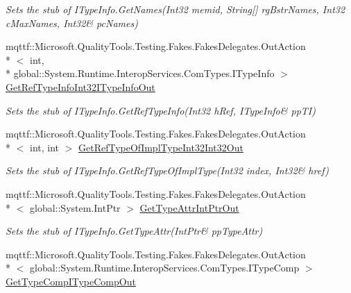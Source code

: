 \begin{DoxyCompactItemize}
\begin{DoxyCompactList}\small\item\em Sets the stub of I\-Type\-Info.\-Get\-Names(Int32 memid, String\mbox{[}\mbox{]} rg\-Bstr\-Names, Int32 c\-Max\-Names, Int32\& pc\-Names)\end{DoxyCompactList}\item 
mqttf\-::\-Microsoft.\-Quality\-Tools.\-Testing.\-Fakes.\-Fakes\-Delegates.\-Out\-Action\\*
$<$ int, \\*
global\-::\-System.\-Runtime.\-Interop\-Services.\-Com\-Types.\-I\-Type\-Info $>$ \hyperlink{class_system_1_1_runtime_1_1_interop_services_1_1_com_types_1_1_fakes_1_1_stub_i_type_info_ab61fd1c516dc7773f06e3f3528cfcbc5}{Get\-Ref\-Type\-Info\-Int32\-I\-Type\-Info\-Out}
\begin{DoxyCompactList}\small\item\em Sets the stub of I\-Type\-Info.\-Get\-Ref\-Type\-Info(Int32 h\-Ref, I\-Type\-Info\& pp\-T\-I)\end{DoxyCompactList}\item 
mqttf\-::\-Microsoft.\-Quality\-Tools.\-Testing.\-Fakes.\-Fakes\-Delegates.\-Out\-Action\\*
$<$ int, int $>$ \hyperlink{class_system_1_1_runtime_1_1_interop_services_1_1_com_types_1_1_fakes_1_1_stub_i_type_info_a479b57511cb0c166d6a0d072e23e4ae1}{Get\-Ref\-Type\-Of\-Impl\-Type\-Int32\-Int32\-Out}
\begin{DoxyCompactList}\small\item\em Sets the stub of I\-Type\-Info.\-Get\-Ref\-Type\-Of\-Impl\-Type(Int32 index, Int32\& href)\end{DoxyCompactList}\item 
mqttf\-::\-Microsoft.\-Quality\-Tools.\-Testing.\-Fakes.\-Fakes\-Delegates.\-Out\-Action\\*
$<$ global\-::\-System.\-Int\-Ptr $>$ \hyperlink{class_system_1_1_runtime_1_1_interop_services_1_1_com_types_1_1_fakes_1_1_stub_i_type_info_a660310d1da969899308cca1a5ece7905}{Get\-Type\-Attr\-Int\-Ptr\-Out}
\begin{DoxyCompactList}\small\item\em Sets the stub of I\-Type\-Info.\-Get\-Type\-Attr(Int\-Ptr\& pp\-Type\-Attr)\end{DoxyCompactList}\item 
mqttf\-::\-Microsoft.\-Quality\-Tools.\-Testing.\-Fakes.\-Fakes\-Delegates.\-Out\-Action\\*
$<$ global\-::\-System.\-Runtime.\-Interop\-Services.\-Com\-Types.\-I\-Type\-Comp $>$ \hyperlink{class_system_1_1_runtime_1_1_interop_services_1_1_com_types_1_1_fakes_1_1_stub_i_type_info_a072525dfd48798dce11cb48fad2e9f25}{Get\-Type\-Comp\-I\-Type\-Comp\-Out}

\end{DoxyCompactItemize}
